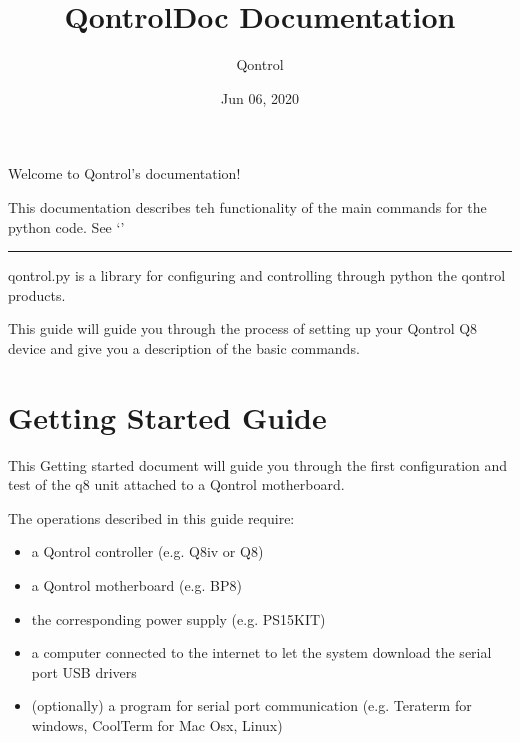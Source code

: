 \documentclass[letterpaper,10pt,english]{sphinxmanual}
\title{QontrolDoc Documentation}
\date{Jun 06, 2020}
\author{Qontrol}
\begin{document}
\maketitle
\sphinxtableofcontents
{}\label{\detokenize{index::doc}}
Welcome to Qontrol’s documentation!

This documentation describes teh functionality of the main commands for the python  code.
See ‘’


\bigskip\hrule\bigskip




qontrol.py is a library for configuring and controlling through python the qontrol products.

This guide will guide you through the process of setting up your Qontrol Q8 device and give you a description of the basic commands.


\chapter{Getting Started Guide}
\label{\detokenize{guide/getting_started:introduction}}\label{\detokenize{guide/getting_started:getting-started-guide}}\label{\detokenize{guide/getting_started:intro}}\label{\detokenize{guide/getting_started::doc}}
This Getting started document will guide you through the first configuration and test of the q8 unit
attached to a Qontrol motherboard.

The operations described in this guide require:
\begin{itemize}
\item {} 
a Qontrol controller (e.g. Q8iv or Q8)

\item {} 
a Qontrol motherboard (e.g. BP8)

\item {} 
the corresponding power supply (e.g. PS15KIT)

\item {} 
a computer connected to the internet to let the system download the serial port USB drivers

\item {} 
(optionally) a program for serial port communication (e.g. Teraterm for windows, CoolTerm for Mac Osx, Linux)

\end{itemize}
\end{document}
